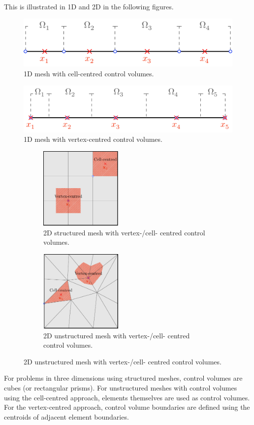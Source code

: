 \documentclass{article}
\begin{document}
This is illustrated in 1D and 2D in the following figures.
\begin{figure}[H]
    \centering
    \includegraphics[width = 0.8\linewidth]{figures/1d-cell-centered.pdf}
    \caption{1D mesh with cell-centred control volumes.} %
\end{figure}
\begin{figure}[H]
    \centering
    \includegraphics[width = 0.8\linewidth]{figures/1d-vertex-centered.pdf}
    \caption{1D mesh with vertex-centred control volumes.} %
\end{figure}
\begin{figure}[H]
    \centering
    \begin{subfigure}[t]{0.45\linewidth}
        \centering
        \includegraphics[height = 4cm]{figures/2d-structured-nodes.pdf}
        \caption{2D structured mesh with vertex-/cell- centred control volumes.} %
    \end{subfigure}
    \begin{subfigure}[t]{0.45\linewidth}
        \centering
        \includegraphics[height = 4cm]{figures/2d-unstructured-nodes.pdf}
        \caption{2D unstructured mesh with vertex-/cell- centred control volumes.} %
    \end{subfigure}
\end{figure}
For problems in three dimensions using structured meshes, control
volumes are cubes (or rectangular prisms). For unstructured meshes with
control volumes using the cell-centred approach, elements themselves are
used as control volumes. For the vertex-centred approach, control volume
boundaries are defined using the centroids of adjacent element boundaries.
\end{document}
